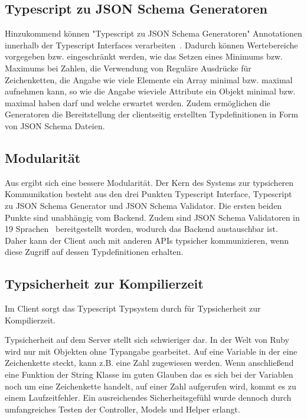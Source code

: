 \subsection{Typescript zu JSON Schema Generatoren}
\label{sec:requirements:pros:generation}
Hinzukommend können "Typescript zu JSON Schema Generatoren" Annotationen innerhalb der Typescript Interfaces verarbeiten~\cite{json-schema-generator-annotations}.
Dadurch können Wertebereiche vorgegeben bzw. eingeschränkt werden,
wie das Setzen eines Minimums bzw. Maximums bei Zahlen, die Verwendung von Reguläre Ausdrücke für Zeichenketten,
die Angabe wie viele Elemente ein Array minimal bzw. maximal aufnehmen kann,
so wie die Angabe wieviele Attribute ein Objekt minimal bzw. maximal haben darf und welche erwartet werden.
Zudem ermöglichen die Generatoren die Bereitstellung der clientseitig erstellten Typdefinitionen in Form von JSON Schema Dateien.

\subsection{Modularität}
\label{sec:requirements:pros:modul}
Aus  ergibt sich eine bessere Modularität.
Der Kern des Systems zur typsicheren Kommunikation besteht aus den drei Punkten Typescript Interface, Typescript zu JSON Schema Generator und
JSON Schema Validator. Die ersten beiden Punkte sind unabhängig vom Backend.
Zudem sind JSON Schema Validatoren in 19 Sprachen~\cite{json-schema-implementations} bereitgestellt worden, wodurch das Backend austauschbar ist.
Daher kann der Client auch mit anderen APIs typsicher kommunizieren, wenn diese Zugriff auf dessen Typdefinitionen erhalten.

\subsection{Typsicherheit zur Kompilierzeit}
\label{sec:requirements:pros:typesafe-compile}
Im Client sorgt das Typescript Typsystem durch für Typsicherheit zur Kompilierzeit.

Typsicherheit auf dem Server stellt sich schwieriger dar. In der Welt von Ruby wird nur mit Objekten ohne Typangabe gearbeitet.
Auf eine Variable in der eine Zeichenkette steckt, kann z.B. eine Zahl zugewiesen werden. Wenn anschließend eine Funktion der String Klasse
im guten Glauben das es sich bei der Variablen noch um eine Zeichenkette handelt, auf einer Zahl aufgerufen wird, kommt es zu einem Laufzeitfehler.
Ein ausreichendes Sicherheitsgefühl wurde dennoch durch umfangreiches Testen der Controller, Models und Helper erlangt.

